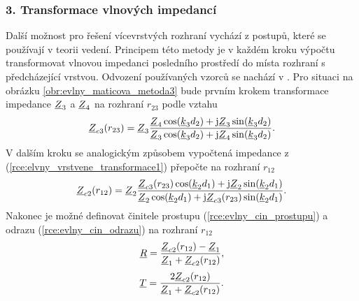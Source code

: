 \subsubsection*{3. Transformace vlnových impedancí}
Další možnost pro řešení vícevrstvých rozhraní vychází z postupů, které se používají v teorii vedení. Principem této metody je v každém kroku výpočtu transformovat vlnovou impedanci posledního prostředí do místa rozhraní s předcházející vrstvou. 
Odvození používaných vzorců se nachází v \cite[str. 106]{emp}.
Pro situaci na obrázku \ref{obr:evlny_maticova_metoda3} bude prvním krokem transformace impedance ${\underline{Z}}_{3}$ a ${\underline{Z}}_{4}$ na rozhraní $r_{23}$ podle vztahu
\begin{equation}
	{\underline{Z}}_{c3}(r_{23}) = {\underline{Z}}_{3}\frac{{\underline{Z}}_{4}\cos({\underline{k}}_{3}d_{2})+\mathrm{j}{\underline{Z}}_{3}\sin({\underline{k}}_{3}d_{2})}{{\underline{Z}}_{3}\cos({\underline{k}}_{3}d_{2})+\mathrm{j}{\underline{Z}}_{4}\sin({\underline{k}}_{3}d_{2})}.
	\label{rce:elvny_vrstvene_transformace1}
\end{equation}
V dalším kroku se analogickým způsobem vypočtená impedance z (\ref{rce:elvny_vrstvene_transformace1}) přepočte na rozhraní $r_{12}$
\begin{equation}
	{\underline{Z}}_{c2}(r_{12}) = {\underline{Z}}_{2}\frac{{\underline{Z}}_{c3}(r_{23})\cos({\underline{k}}_{2}d_{1})+\mathrm{j}{\underline{Z}}_{2}\sin({\underline{k}}_{2}d_{1})}{{\underline{Z}}_{2}\cos({\underline{k}}_{2}d_{1})+\mathrm{j}{\underline{Z}}_{c3}(r_{23})\sin({\underline{k}}_{2}d_{1})}.
	\label{rce:elvny_vrstvene_transformace2}
\end{equation}
Nakonec je možné definovat činitele prostupu (\ref{rce:evlny_cin_prostupu}) a odrazu (\ref{rce:evlny_cin_odrazu}) na rozhraní $r_{12}$
\begin{equation}
	{\underline{R}} = \frac{{\underline{Z}}_{c2}(r_{12}) - {\underline{Z}}_{1}}{{\underline{Z}}_{1} + {\underline{Z}}_{c2}(r_{12})}
	\label{rce:elvny_vrstvene_transf_R},
\end{equation}
\begin{equation}
	{\underline{T}} = \frac{2{\underline{Z}}_{c2}(r_{12})}{{\underline{Z}}_{1} + {\underline{Z}}_{c2}(r_{12})}
	\label{rce:elvny_vrstvene_transf_T}.
\end{equation}
\newpage

